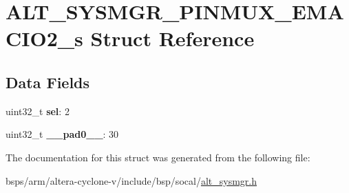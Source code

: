 \hypertarget{structALT__SYSMGR__PINMUX__EMACIO2__s}{}\section{A\+L\+T\+\_\+\+S\+Y\+S\+M\+G\+R\+\_\+\+P\+I\+N\+M\+U\+X\+\_\+\+E\+M\+A\+C\+I\+O2\+\_\+s Struct Reference}
\label{structALT__SYSMGR__PINMUX__EMACIO2__s}
\subsection*{Data Fields}
\begin{DoxyCompactItemize}
\item 
\mbox{\label{structALT__SYSMGR__PINMUX__EMACIO2__s_aeb69bb0d6bd0ccf8a1fce0b754c6c866}} 
uint32\+\_\+t {\bfseries sel}\+: 2
\item 
\mbox{\label{structALT__SYSMGR__PINMUX__EMACIO2__s_aac386d172d8c5a477791717d059ae0e9}} 
uint32\+\_\+t {\bfseries \+\_\+\+\_\+pad0\+\_\+\+\_\+}\+: 30
\end{DoxyCompactItemize}


The documentation for this struct was generated from the following file\+:\begin{DoxyCompactItemize}
\item 
bsps/arm/altera-\/cyclone-\/v/include/bsp/socal/\mbox{\hyperlink{alt__sysmgr_8h}{alt\+\_\+sysmgr.\+h}}\end{DoxyCompactItemize}
